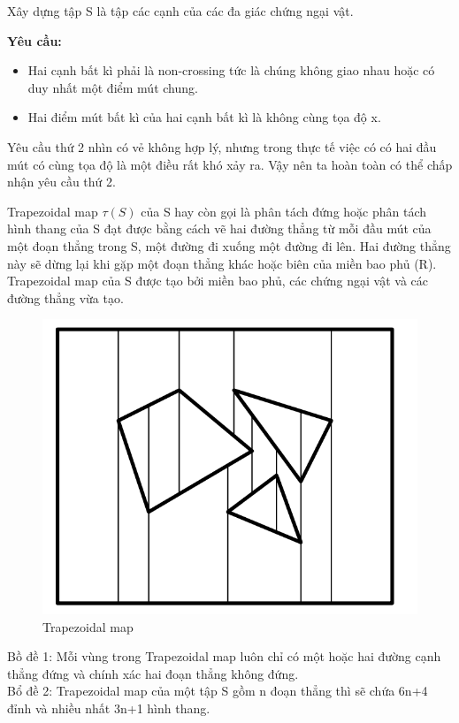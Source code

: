 \documentclass[a4paper,12pt]{report}
\begin{document}
Xây dựng tập S là tập các cạnh của các đa giác chứng ngại vật.

\textbf{Yêu cầu:} 
\begin{itemize}
\item Hai cạnh bất kì phải là non-crossing tức là chúng không giao nhau hoặc có duy nhất một điểm mút chung.
\item Hai điểm mút bất kì của hai cạnh bất kì là không cùng tọa độ x.
\end{itemize}

Yêu cầu thứ 2 nhìn có vẻ không hợp lý, nhưng trong thực tế việc có có hai đầu mút có cùng tọa độ là một điều rất khó xảy ra. Vậy nên ta hoàn toàn có thể chấp nhận yêu cầu thứ 2.

Trapezoidal map $\tau(S)$ của S hay còn gọi là  phân tách đứng hoặc phân tách hình thang của S đạt được bằng cách vẽ hai đường thẳng từ mỗi đầu mút của một đoạn thẳng trong S, một đường đi xuống một đường đi lên. Hai đường thẳng này sẽ dừng lại khi gặp một đoạn thẳng khác hoặc biên của miền bao phủ (R). Trapezoidal map của S được tạo bởi miền bao phủ, các chứng ngại vật và các đường thẳng vừa tạo. \\
\begin{figure}[H]
\label{object_pic}
\centering
\includegraphics[scale=0.4]{trmap.png}
\caption{Trapezoidal map}
\end{figure}
Bồ đề 1: Mỗi vùng trong Trapezoidal map luôn chỉ có một hoặc hai đường cạnh thẳng đứng và chính xác hai đoạn thẳng không đứng.\\

Bổ đề 2: Trapezoidal map của một tập S gồm n đoạn thẳng thì sẽ chứa 6n+4 đỉnh và nhiều nhất 3n+1 hình thang.\\
\end{document}
